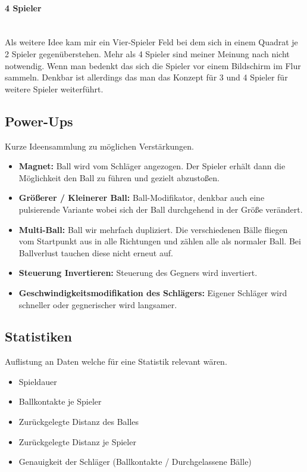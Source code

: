 \paragraph{4 Spieler}
\mbox{}\\
Als weitere Idee kam mir ein Vier-Spieler Feld bei dem sich in einem Quadrat je 2 Spieler gegenüberstehen.
\newline
Mehr als 4 Spieler sind meiner Meinung nach nicht notwendig. Wenn man bedenkt das sich die Spieler vor einem Bildschirm im Flur sammeln.
\newline
Denkbar ist allerdings das man das Konzept für 3 und 4 Spieler für weitere Spieler weiterführt.
\newpage
\subsection{Power-Ups}
Kurze Ideensammlung zu möglichen Verstärkungen.
\begin{itemize}
	\item
	      \textbf{Magnet:} Ball wird vom Schläger angezogen. Der Spieler erhält dann die Möglichkeit den Ball zu führen und gezielt abzustoßen.
	\item
	      \textbf{Größerer / Kleinerer Ball:} Ball-Modifikator, denkbar auch eine pulsierende Variante wobei sich der Ball durchgehend in der Größe verändert.
	\item
	      \textbf{Multi-Ball:} Ball wir mehrfach dupliziert. Die verschiedenen Bälle fliegen vom Startpunkt aus in alle Richtungen und zählen alle als normaler Ball. Bei Ballverlust tauchen diese nicht erneut auf.
	\item
	      \textbf{Steuerung Invertieren:} Steuerung des Gegners wird invertiert.
	\item
	      \textbf{Geschwindigkeitsmodifikation des Schlägers:} Eigener Schläger wird schneller oder gegnerischer wird langsamer.
\end{itemize}
\subsection{Statistiken}
Auflistung an Daten welche für eine Statistik relevant wären.
\begin{itemize}
	\item
	      Spieldauer
	\item
	      Ballkontakte je Spieler
	\item
	      Zurückgelegte Distanz des Balles
	\item
	      Zurückgelegte Distanz je Spieler
	\item
	      Genauigkeit der Schläger
	      \newline
	      (Ballkontakte / Durchgelassene Bälle)
\end{itemize}
\newpage
